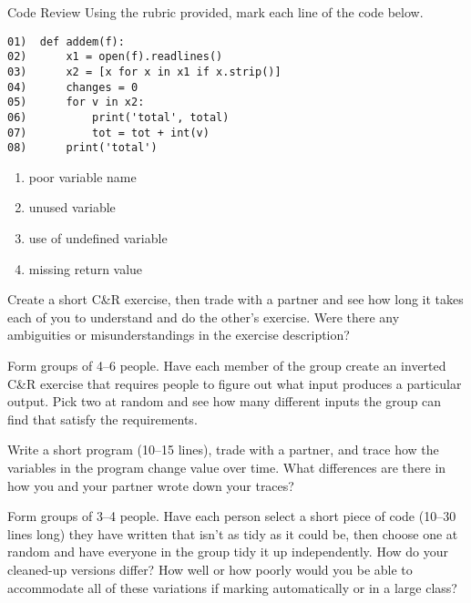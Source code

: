 \begin{aside}{Code Review}
  Using the rubric provided, mark each line of the code below.

\begin{verbatim}
01)  def addem(f):
02)      x1 = open(f).readlines()
03)      x2 = [x for x in x1 if x.strip()]
04)      changes = 0
05)      for v in x2:
06)          print('total', total)
07)          tot = tot + int(v)
08)      print('total')
\end{verbatim}

  \begin{enumerate}
  \item
    poor variable name
  \item
    unused variable
  \item
    use of undefined variable
  \item
    missing return value
  \end{enumerate}
\end{aside}



Create a short C\&R exercise,
then trade with a partner
and see how long it takes each of you to understand and do the other's exercise.
Were there any ambiguities or misunderstandings in the exercise description?


Form groups of 4--6 people.
Have each member of the group create an inverted C\&R exercise
that requires people to figure out what input produces a particular output.
Pick two at random
and see how many different inputs the group can find that satisfy the requirements.


Write a short program (10--15 lines),
trade with a partner,
and trace how the variables in the program change value over time.
What differences are there in how you and your partner wrote down your traces?


Form groups of 3--4 people.
Have each person select a short piece of code (10--30 lines long) they have written
that isn't as tidy as it could be,
then choose one at random and have everyone in the group tidy it up independently.
How do your cleaned-up versions differ?
How well or how poorly would you be able to accommodate all of these variations
if marking automatically or in a large class?

